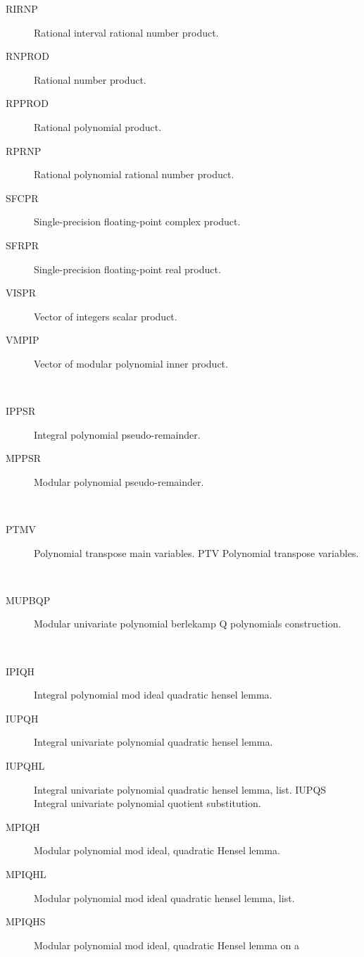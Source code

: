 \begin{description}
\begin{description}
  \item[RIRNP]  Rational interval rational number product.
  \item[RNPROD]  Rational number product.
  \item[RPPROD]  Rational polynomial product.
  \item[RPRNP]  Rational polynomial rational number product.
  \item[SFCPR]  Single-precision floating-point complex product.
  \item[SFRPR]  Single-precision floating-point real product.
  \item[VISPR]  Vector of integers scalar product.
  \item[VMPIP]  Vector of modular polynomial inner product.
  \end{description}
\item[pseudo] \ \ 
  \begin{description}
  \item[IPPSR]  Integral polynomial pseudo-remainder.
  \item[MPPSR]  Modular polynomial pseudo-remainder.
  \end{description}
\item[ptv] \ \ 
  \begin{description}
  \item[PTMV]  Polynomial transpose main variables. PTV Polynomial transpose
    variables.
  \end{description}
\item[q] \ \ 
  \begin{description}
  \item[MUPBQP]  Modular univariate polynomial berlekamp Q polynomials
    construction.
  \end{description}
\item[quadratic] \ \ 
  \begin{description}
  \item[IPIQH]  Integral polynomial mod ideal quadratic hensel lemma.
  \item[IUPQH]  Integral univariate polynomial quadratic hensel lemma.
  \item[IUPQHL]  Integral univariate polynomial quadratic hensel lemma, list.
    IUPQS Integral univariate polynomial quotient substitution.
  \item[MPIQH]  Modular polynomial mod ideal, quadratic Hensel lemma.
  \item[MPIQHL]  Modular polynomial mod ideal quadratic hensel lemma, list.
  \item[MPIQHS]  Modular polynomial mod ideal, quadratic Hensel lemma on a

\end{description}
\end{description}
